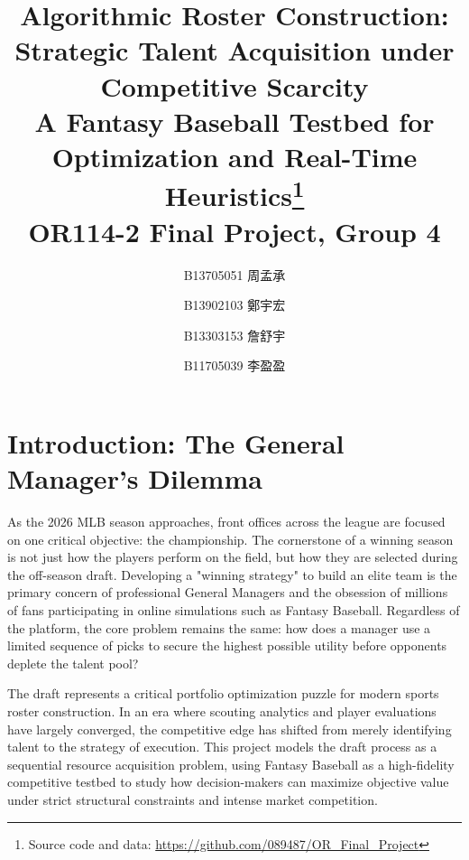 \documentclass[11pt,a4paper]{article}
\title{\textbf{Algorithmic Roster Construction: \\ Strategic Talent Acquisition under Competitive Scarcity} \\[0.5em]
\large A Fantasy Baseball Testbed for Optimization and Real-Time Heuristics\thanks{Source code and data: \url{https://github.com/089487/OR_Final_Project}} \\[1em]
\normalsize OR114-2 Final Project, Group 4}
\author{
B13705051 周孟承 \and
B13902103 鄭宇宏 \and
B13303153 詹舒宇 \and
B11705039 李盈盈
}
\date{}
\begin{document}
\maketitle

\vspace{-3em}  %



\section{Introduction: The General Manager's Dilemma}

As the 2026 MLB season approaches, front offices across the league are focused on one critical objective: the championship. The cornerstone of a winning season is not just how the players perform on the field, but how they are selected during the off-season draft. Developing a "winning strategy" to build an elite team is the primary concern of professional General Managers and the obsession of millions of fans participating in online simulations such as Fantasy Baseball. Regardless of the platform, the core problem remains the same: how does a manager use a limited sequence of picks to secure the highest possible utility before opponents deplete the talent pool?

The draft represents a critical portfolio optimization puzzle for modern sports roster construction. In an era where scouting analytics and player evaluations have largely converged, the competitive edge has shifted from merely identifying talent to the strategy of execution. This project models the draft process as a sequential resource acquisition problem, using Fantasy Baseball as a high-fidelity competitive testbed to study how decision-makers can maximize objective value under strict structural constraints and intense market competition.
\end{document}
